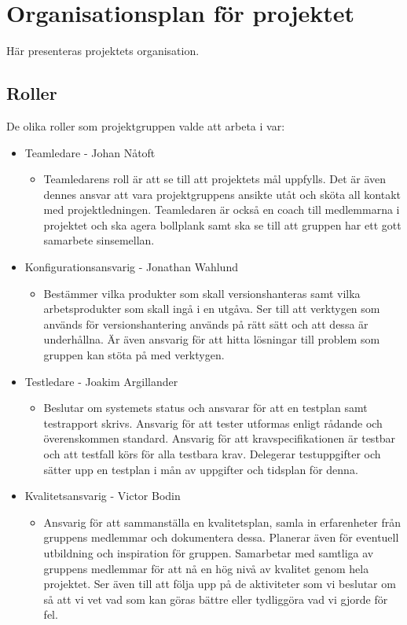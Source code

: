 \section{Organisationsplan för projektet}
Här presenteras projektets organisation.

\subsection{Roller}
De olika roller som projektgruppen valde att arbeta i var:\\
\begin{itemize}
\item Teamledare - Johan Nåtoft
	\begin{itemize}
		\item Teamledarens roll är att se till att projektets mål uppfylls. Det är även dennes ansvar att vara projektgruppens ansikte utåt och sköta all kontakt med projektledningen. Teamledaren är också en coach till medlemmarna i projektet och ska agera bollplank samt ska se till att gruppen har ett gott samarbete sinsemellan. 
	\end{itemize}
\item Konfigurationsansvarig - Jonathan Wahlund
	\begin{itemize}
		\item Bestämmer vilka produkter som skall versionshanteras samt vilka arbetsprodukter som skall ingå i en utgåva. Ser till att verktygen som används för versionshantering används på rätt sätt och att dessa är underhållna. Är även ansvarig för att hitta lösningar till problem som gruppen kan stöta på med verktygen. 
	\end{itemize}
\item Testledare - Joakim Argillander
	\begin{itemize}
		\item Beslutar om systemets status och ansvarar för att en testplan samt testrapport skrivs. Ansvarig för att tester utformas enligt rådande och överenskommen standard. Ansvarig för att kravspecifikationen är testbar och att testfall körs för alla testbara krav. Delegerar testuppgifter och sätter upp en testplan i mån av uppgifter och tidsplan för denna.
	\end{itemize}
\item Kvalitetsansvarig - Victor Bodin
	\begin{itemize}
		\item Ansvarig för att sammanställa en kvalitetsplan, samla in erfarenheter från gruppens medlemmar och dokumentera dessa. Planerar även för eventuell utbildning och inspiration för gruppen. Samarbetar med samtliga av gruppens medlemmar för att nå en hög nivå av kvalitet genom hela projektet. Ser även till att följa upp på de aktiviteter som vi beslutar om så att vi vet vad som kan göras bättre eller tydliggöra vad vi gjorde för fel.

\end{itemize}
\end{itemize}
